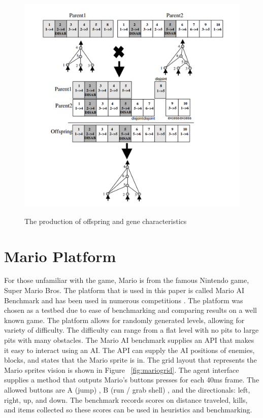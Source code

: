 \documentclass[12pt]{ucthesis} \newif\ifpdf \ifx\pdfoutput\undefined
\begin{document}
\begin{figure}[h!] 
\caption{The production of offspring and gene characteristics
\cite{stanley:phd04}}
  \centering
    \includegraphics[width=1\textwidth]{parentgenes.png}
   \label{fig:parentgenes}
\end{figure}


\section{Mario Platform}
For those unfamiliar with the game, Mario is from the famous Nintendo game,
Super Mario Bros.
The platform that is used in this paper is called Mario AI Benchmark and has
been used in numerous competitions \cite{karakovskiy2012mario}. The platform was chosen as a
testbed due to ease of benchmarking and comparing results on a well
known game. The platform allows for randomly generated levels, allowing for
variety of difficulty. The difficulty can range from a flat level with no pits to large
pits with many obstacles. The Mario AI benchmark supplies an API that makes it
easy to interact using an AI. The API can supply the AI positions of enemies, blocks, and states
that the Mario sprite is in. The grid layout that represents the Mario sprites
vision is shown in Figure ~\ref{fig:mariogrid}. The agent interface supplies a method
that outputs Mario’s buttons presses for each 40ms frame. The allowed buttons
are A (jump) , B (run / grab shell) , and the directionals: left, right, up,
and down. The benchmark records scores on distance traveled, kills, and items
collected so these scores can be used in heuristics and benchmarking.
\end{document}
